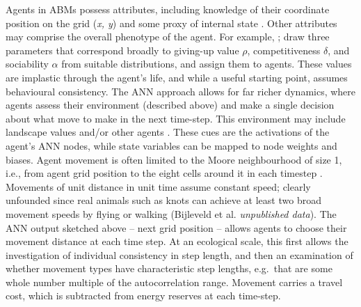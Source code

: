 Agents in ABMs possess attributes, including knowledge of their
coordinate position on the grid (\emph{x, y}) and some proxy of internal
state \citep[energy reserves; e.g.][]{vangils2010}. Other attributes may
comprise the overall phenotype of the agent. For example,
\citet{getz2015}; \citet{getz2016} draw three parameters that correspond
broadly to giving-up value $\rho$, competitiveness $\delta$, and sociability $\alpha$ from
suitable distributions, and assign them to agents. These values are
implastic through the agent's life, and while a useful starting point,
assumes behavioural consistency. The ANN approach allows for far richer
dynamics, where agents assess their environment (described above) and
make a single decision about what move to make in the next time-step.
This environment may include landscape values and/or other agents
\citep{netz2017}. These cues are the activations of the agent's ANN
nodes, while state variables can be mapped to node weights and biases.
Agent movement is often limited to the Moore neighbourhood of size 1,
i.e., from agent grid position to the eight cells around it in each
timestep \citep{getz2015, netz2017}. Movements of unit distance in unit
time assume constant speed; clearly unfounded since real animals such as
knots can achieve at least two broad movement speeds by flying or
walking (Bijleveld et al. \emph{unpublished data}). The ANN output
sketched above -- next grid position -- allows agents to choose their
movement distance at each time step. At an ecological scale, this first
allows the investigation of individual consistency in step length, and
then an examination of whether movement types have characteristic step
lengths, e.g.~that are some whole number multiple of the autocorrelation
range. Movement carries a travel cost, which is subtracted from energy
reserves at each time-step.

